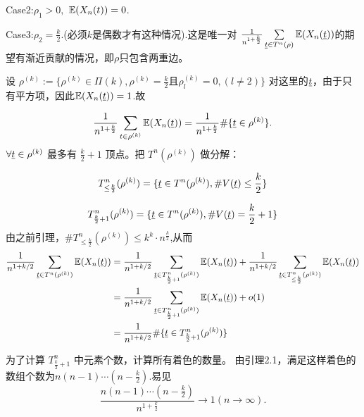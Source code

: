 Case2:\( \rho_1 > 0, \) \( \mathbb{E}(X_n(t)) = 0 \).

Case3:\(\rho_2=\frac k2.\)(必须$k$是偶数才有这种情况).这是唯一对
${\frac1{n^{1+\frac{k}{2}}}} \sum\limits_{\underline{t} \in T^n(\rho)} \mathbb{E}(X_n(\underline{t}))$的期望有渐近贡献的情况，即$\rho$只包含两重边。

设 \( \rho^{(k)} := \{ \rho^{(k)} \in \Pi(k), \rho^{(k)} = \frac{k}{2} \text{且}\rho_l^{(k)} = 0, (l\neq 2) \} \)
对这里的$\underline{t}$，由于只有平方项，因此$\mathbb{E}(X_n(\underline{t}))=1$.故

\begin{equation*}
\frac{1}{n^{1+\frac{k}{2}}} \sum_{t \in \rho^{(k)}} \mathbb{E}(X_n(\underline{t}))=\frac{1}{n^{1+\frac{k}{2}}} \#\{\underline{t}\in\rho^{(k)}\}.
\end{equation*}
\(\forall \underline{t} \in \rho^{(k)} \) 最多有 \( \frac{k}{2} + 1 \) 顶点。把 \( T^n(\rho^{(k)}) \) 做分解：

\begin{equation*}
T_{\leq \frac{k}{2}}^n (\rho^{(k)}) = \{ \underline{t} \in T^n(\rho^{(k)}) , \# V(\underline{t}) \leq \frac{k}{2} \}
\end{equation*}

\begin{equation*}
T_{\frac{k}{2}+1}^n (\rho^{(k)}) = \{\underline{t} \in T^n(\rho^{(k)}) , \# V(\underline{t}) = \frac{k}{2} + 1 \}
\end{equation*}
由之前引理，\(\# T_{\leq \frac{k}{2}}^n (\rho^{(k)}) \leq k^k \cdot n^{\frac{k}{2}}\),从而
\begin{equation*}
    \begin{aligned}
        \frac{1}{n^{1+k/2}}\sum_{\underline{t}\in T^n(\rho^{(k)})}\mathbb{E}(X_n(\underline{t}))&=\frac{1}{n^{1+k/2}}\sum_{\underline{t}\in T_{\frac k2+1}^n(\rho^{(k)})}\mathbb{E}(X_n(\underline{t}))+\frac{1}{n^{1+k/2}}\sum_{\underline{t}\in T_{\le \frac k2}^n(\rho^{(k)})}\mathbb{E}(X_n(\underline{t}))\\
        &=\frac{1}{n^{1+k/2}}\sum_{\underline{t}\in T_{\frac k2+1}^n(\rho^{(k)})}\mathbb{E}(X_n(\underline{t}))+o(1)\\
        &=\frac{1}{n^{1+k/2}}\#\{\underline{t}\in T_{\frac k2+1}^n(\rho^{(k)})\}
    \end{aligned}
\end{equation*}

为了计算 \( T_{\frac{k}{2}+1}^n \) 中元素个数，计算所有着色的数量。
由引理2.1，满足这样着色的数组个数为$n(n-1)\cdots(n-\frac k2)$.易见
\[\frac{n(n-1)\cdots(n-\frac k2)}{n^{1+\frac k2}}\rightarrow 1(n\to \infty).\]